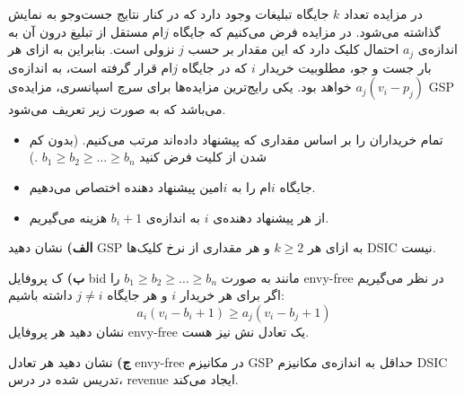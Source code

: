 در مزایده
تعداد $k$ جایگاه تبلیغات وجود دارد که در کنار نتایج جست‌و‌جو به نمایش گذاشته می‌شود. در مزایده فرض می‌کنیم که جایگاه $j$ام مستقل از تبلیغ درون آن به اندازه‌ی $a_j$ احتمال کلیک دارد که این مقدار بر حسب $j$ نزولی است. بنابراین به ازای هر بار جست و جو، مطلوبیت خریدار $i$ که در جایگاه $j$ام قرار گرفته است، به اندازه‌ی
$a_j(v_i - p_j)$
خواهد بود. یکی رایج‌ترین مزایده‌ها برای سرچ اسپانسری، مزایده‌ی GSP می‌باشد که به صورت زیر تعریف می‌شود.
\begin{itemize}
    \item
    تمام خریداران را بر اساس مقداری که پیشنهاد داده‌اند مرتب می‌کنیم. (بدون کم شدن از کلیت فرض کنید
    $b_1 \geq b_2 \geq \ldots \geq b_n$
    .)

    \item
    جایگاه $i$ام را به $i$امین پیشنهاد دهنده اختصاص می‌دهیم.

    \item
    از هر پیشنهاد دهنده‌ی $i$ به اندازه‌ی $b_i + 1$ هزینه می‌گیریم.

\end{itemize}

\vspace*{5pt}
\textbf{الف)}
نشان دهید GSP به ازای هر
$k \geq 2$
و هر مقداری از نرخ‌ کلیک‌ها DSIC نیست.

\vspace*{5pt}
\textbf{ب)}
ک پروفایل bid مانند به صورت
$b_1 \geq b_2 \geq \ldots \geq b_n$
را envy-free در نظر می‌گیریم اگر برای هر خریدار $i$ و هر جایگاه $j\ne i$ داشته باشیم:
\[
    a_i(v_i - b_i + 1) \geq a_j(v_i - b_j + 1)    
\]
نشان دهید هر پروفایل envy-free یک تعادل نش نیز هست.

\vspace*{5pt}
\textbf{ج)}
نشان دهید هر تعادل envy-free در مکانیزم GSP حداقل به اندازه‌ی مکانیزم DSIC تدریس شده در درس، revenue ایجاد می‌کند.